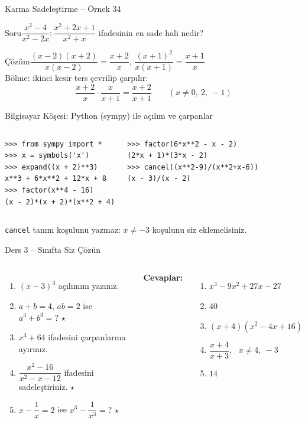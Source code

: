 \documentclass[aspectratio=169,11pt]{beamer}
\newcommand{\soru}[3]{%
\begin{frame}{#1}
  \begin{block}{Soru}\large #2\end{block}
  \pause
  \begin{exampleblock}{Çözüm}\large #3\end{exampleblock}
\end{frame}}
\begin{document}
\soru{Karma Sadeleştirme -- Örnek 34}
{\(\dfrac{x^2-4}{x^2-2x}:\dfrac{x^2+2x+1}{x^2+x}\) ifadesinin en sade hali nedir?}
{\(\dfrac{(x-2)(x+2)}{x(x-2)}=\dfrac{x+2}{x}\), \quad \(\dfrac{(x+1)^2}{x(x+1)}=\dfrac{x+1}{x}\)\\[3pt]
Bölme: ikinci kesir ters çevrilip çarpılır:
\[\frac{x+2}{x}\cdot\frac{x}{x+1}=\frac{x+2}{x+1}\qquad(x\neq 0,\ 2,\ -1)\]}

\begin{frame}[fragile]{Bilgisayar Köşesi: Python (sympy) ile açılım ve çarpanlar}
\begin{columns}[t]
\begin{verbatim}
>>> from sympy import *
>>> x = symbols('x')
>>> expand((x + 2)**3)
x**3 + 6*x**2 + 12*x + 8
>>> factor(x**4 - 16)
(x - 2)*(x + 2)*(x**2 + 4)
\end{verbatim}
\begin{verbatim}
>>> factor(6*x**2 - x - 2)
(2*x + 1)*(3*x - 2)
>>> cancel((x**2-9)/(x**2+x-6))
(x - 3)/(x - 2)
\end{verbatim}
\end{columns}
\small \verb|cancel| tanım koşulunu yazmaz: \(x\neq -3\) koşulunu siz eklemelisiniz.
\end{frame}

\begin{frame}{Ders 3 -- Sınıfta Siz Çözün}
\begin{columns}[t]
\begin{enumerate}
\item \((x-3)^3\) açılımını yazınız.
\item \(a+b=4\), \(ab=2\) ise \(a^3+b^3=?\) \(\star\)
\item \(x^3+64\) ifadesini çarpanlarına ayırınız.
\item \(\dfrac{x^2-16}{x^2-x-12}\) ifadesini sadeleştiriniz. \(\star\)
\item \(x-\dfrac{1}{x}=2\) ise \(x^3-\dfrac{1}{x^3}=?\) \(\star\)
\end{enumerate}
\pause
\textbf{Cevaplar:}
\begin{enumerate}
\item \(x^3-9x^2+27x-27\)
\item \(40\)
\item \((x+4)(x^2-4x+16)\)
\item \(\dfrac{x+4}{x+3}\), \ \(x\neq 4,\ -3\)
\item \(14\)
\end{enumerate}
\end{columns}
\vspace{4pt}{\footnotesize \(\star\) işaretli soruların adım adım çözümü sonraki slaytlardadır.}
\end{frame}
\end{document}
